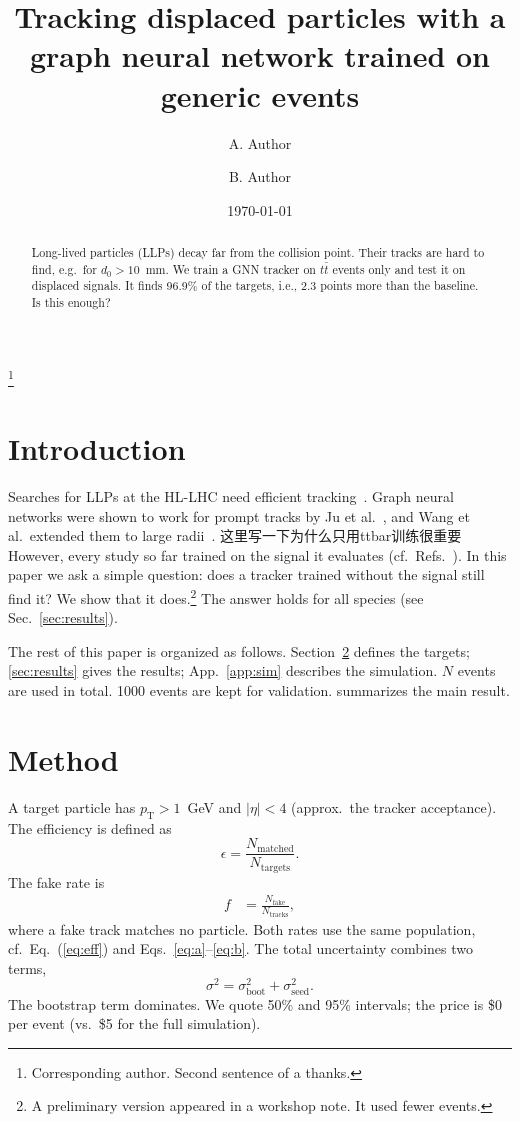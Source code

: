 \documentclass[aps,prd,twocolumn,superscriptaddress,nofootinbib]{revtex4-2}
\newcommand{\be}{\begin{equation}}
\newcommand{\ee}{\end{equation}}
\newcommand{\etal}{et al.}
\newcommand{\pT}{p_{\mathrm{T}}}
\newcommand{\ttbar}{\ensuremath{t\bar{t}}}
\newcommand{\GNN}{GNN}
\def\HL{HL-LHC}
\begin{document}
\title{Tracking displaced particles with a graph neural network trained on generic events}
\author{A. Author}
\thanks{Corresponding author. Second sentence of a thanks.}
\author{B. Author}
\date{\today}

\begin{abstract}
Long-lived particles (LLPs) decay far from the collision point. Their tracks are hard to find, e.g.\ for $d_0 > 10$~mm.
We train a \GNN{} tracker on \ttbar{} events only and test it on displaced signals.
It finds 96.9\% of the targets, i.e., 2.3 points more than the baseline. Is this enough?
\end{abstract}

\maketitle

\section{Introduction}
\label{sec:intro}
Searches for LLPs at the \HL{} need efficient tracking~\cite{Ju2022Zenodo,Lee2019}.
Graph neural networks were shown to work for prompt tracks by Ju \etal~\cite{Ju2021}, and Wang et al.\ extended them to large radii~\cite{Wang2022LRT}.
这里写一下为什么只用ttbar训练很重要
However, every study so far trained on the signal it evaluates (cf.\ Refs.~\cite{Lee2019,Wang2022LRT}).
In this paper we ask a simple question: does a tracker trained without the signal still find it?
We show that it does.\footnote{A preliminary version appeared in a workshop note. It used fewer events.} The answer holds for all species (see Sec.~\ref{sec:results}).

The rest of this paper is organized as follows.
Section~\ref{sec:method} defines the targets; \cref{sec:results} gives the results; App.~\ref{app:sim} describes the simulation.
$N$ events are used in total.
1000 events are kept for validation.
 summarizes the main result.

\section{Method}
\label{sec:method}
A target particle has $\pT > 1$~GeV and $|\eta| < 4$ (approx.\ the tracker acceptance).
The efficiency is defined as
\be
  \epsilon = \frac{N_{\text{matched}}}{N_{\text{targets}}}.
\ee
The fake rate is
\begin{align*}
  f &= \frac{N_{\text{fake}}}{N_{\text{tracks}}},
\end{align*}
where a fake track matches no particle.
Both rates use the same population, cf.~Eq.~(\ref{eq:eff}) and Eqs.~\eqref{eq:a}--\eqref{eq:b}.
The total uncertainty combines two terms,
\[
  \sigma^2 = \sigma_{\text{boot}}^2 + \sigma_{\text{seed}}^2 .
\]
The bootstrap term dominates. %
We quote 50\% and 95\% intervals; the price is \$0 per event (vs.\ \$5 for the full simulation).
\end{document}
